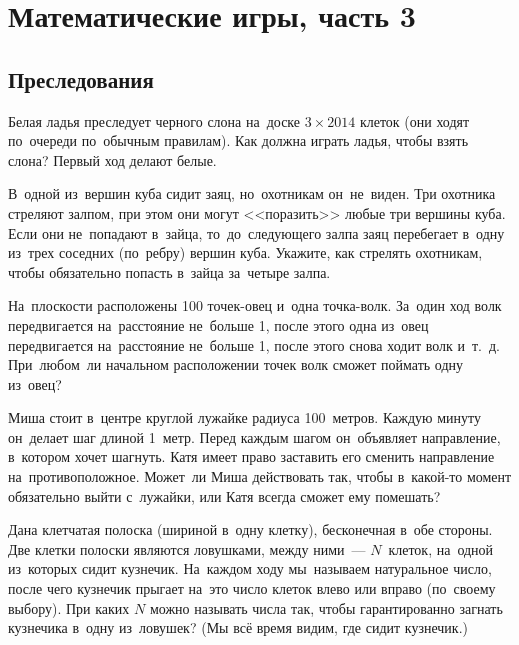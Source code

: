 

\section*{Математические игры, часть 3}



\subsection*{Преследования}

\begin{problems}

\item
Белая ладья преследует черного слона на~доске $3 \times 2014$ клеток
(они ходят по~очереди по~обычным правилам).
Как должна играть ладья, чтобы взять слона?
Первый ход делают белые.

\item
В~одной из~вершин куба сидит заяц, но~охотникам он~не~виден.
Три охотника стреляют залпом, при этом они могут <<поразить>> любые три вершины
куба.
Если они не~попадают в~зайца, то~до~следующего залпа заяц перебегает в~одну
из~трех соседних (по~ребру) вершин куба.
Укажите, как стрелять охотникам, чтобы обязательно попасть в~зайца за~четыре
залпа.

\item
На~плоскости расположены 100 точек-овец и~одна точка-волк.
За~один ход волк передвигается на~расстояние не~больше 1, после этого одна
из~овец передвигается на~расстояние не~больше 1, после этого снова ходит волк
и~т.~д.
При~любом~ли начальном расположении точек волк сможет поймать одну из~овец?

\item
Миша стоит в~центре круглой лужайке радиуса 100~метров.
Каждую минуту он~делает шаг длиной 1~метр.
Перед каждым шагом он~объявляет направление, в~котором хочет шагнуть.
Катя имеет право заставить его сменить направление на~противоположное.
Может~ли Миша действовать так, чтобы в~какой-то момент обязательно выйти
с~лужайки, или Катя всегда сможет ему помешать?

\item
Дана клетчатая полоска (шириной в~одну клетку), бесконечная в~обе стороны.
Две клетки полоски являются ловушками, между ними~--- $N$~клеток, на~одной
из~которых сидит кузнечик.
На~каждом ходу мы~называем натуральное число, после чего кузнечик прыгает
на~это число клеток влево или вправо (по~своему выбору).
При каких $N$ можно называть числа так, чтобы гарантированно загнать кузнечика
в~одну из~ловушек? (Мы всё время видим, где сидит кузнечик.)


\end{problems}
